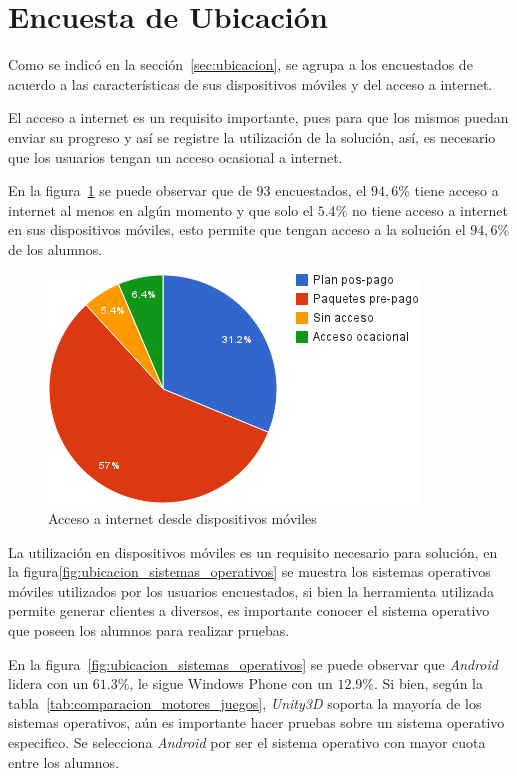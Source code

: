 \section{Encuesta de Ubicación}
\label{sec:res_ubicacion}

Como se indicó en la sección~\ref{sec:ubicacion}, se agrupa a los
 encuestados de acuerdo a las características de sus
dispositivos móviles y del acceso a internet.

El acceso a internet es un requisito importante, pues para que los mismos puedan
enviar su progreso y así se registre la utilización de la solución, así, es
necesario que los usuarios tengan un acceso ocasional a internet. 

En la figura~\ref{fig:ubicacion_acceso_internet} se puede observar que de 93
encuestados, el $94,6\%$ tiene acceso a internet al menos en algún momento y que
solo el $5.4\%$ no tiene acceso a internet en sus dispositivos móviles, esto
permite que tengan acceso a la solución el $94,6\%$ de los alumnos.

\begin{figure}[H]
\centering
\includegraphics[scale=0.5]{resultados/imagenes/ubicacion_acceso_internet.png}
\caption{Acceso a internet desde dispositivos móviles}
\label{fig:ubicacion_acceso_internet}
\end{figure}

La utilización en dispositivos móviles es un requisito necesario para
 solución, en la
figura\ref{fig:ubicacion_sistemas_operativos} se muestra los sistemas operativos
móviles utilizados por los usuarios encuestados, si bien la herramienta
utilizada permite generar clientes a diversos, es importante conocer el sistema
operativo que poseen los alumnos para realizar pruebas.

En la figura~\ref{fig:ubicacion_sistemas_operativos} se puede observar que
\emph{Android} lidera con un $61.3\%$, le sigue Windows Phone con un $12.9\%$.
Si bien, según la tabla~\ref{tab:comparacion_motores_juegos}, \emph{Unity3D}
soporta la mayoría de los sistemas operativos, aún es importante hacer pruebas
sobre un sistema operativo especifico. Se selecciona \emph{Android} por ser el
sistema operativo con mayor cuota entre los alumnos.

